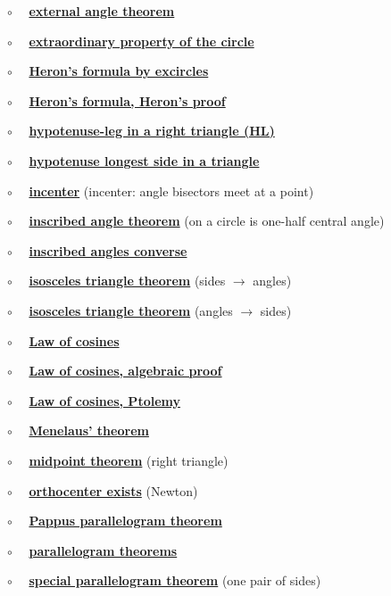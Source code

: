 \documentclass[11pt, oneside]{article}
\begin{document}
$\circ$ \ \ \hyperref[sec:external_angle_theorem]{\textbf{external angle theorem}}

$\circ$ \ \ \hyperref[sec:extraordinary_property]{\textbf{extraordinary property of the circle}}

$\circ$ \ \ \hyperref[sec:Heron_formula_excircles]{\textbf{Heron's formula by excircles}}

$\circ$ \ \ \hyperref[sec:Heron_formula_Heron]{\textbf{Heron's formula, Heron's proof}}

$\circ$ \ \ \hyperref[sec:SSA_in_right]{\textbf{hypotenuse-leg in a right triangle (HL)}}

$\circ$ \ \ \hyperref[sec:hypotenuse_longest]{\textbf{hypotenuse longest side in a triangle}}

$\circ$ \ \ \hyperref[sec:incenter]{\textbf{incenter}} (incenter:  angle bisectors meet at a point)

$\circ$ \ \ \hyperref[sec:inscribed_angle_theorem]{\textbf{inscribed angle theorem}} (on a circle is one-half central angle)

$\circ$ \ \ \hyperref[sec:inscribed_angles_converse]{\textbf{inscribed angles converse}}

$\circ$ \ \  \hyperref[sec:isosceles_triangle_theorem]{\textbf{isosceles triangle theorem}} (sides $\rightarrow$ angles)

$\circ$ \ \  \hyperref[sec:isosceles_converse]{\textbf{isosceles triangle theorem}} (angles $\rightarrow$ sides)

$\circ$ \ \ \hyperref[sec:law_of_cosines]{\textbf{Law of cosines}}

$\circ$ \ \ \hyperref[sec:law_of_cosines_algebraic]{\textbf{Law of cosines, algebraic proof}}

$\circ$ \ \ \hyperref[sec:LOC_by_Ptolemy]{\textbf{Law of cosines, Ptolemy}}

$\circ$ \ \ \hyperref[sec:Menelaus_theorem]{\textbf{Menelaus' theorem}}

$\circ$ \ \ \hyperref[sec:right_triangle_midpoint_theorem]{\textbf{midpoint theorem}} (right triangle)

$\circ$ \ \ \hyperref[sec:Newton_altitude]{\textbf{orthocenter exists}}  (Newton)

$\circ$ \ \ \hyperref[sec:PProof_Pappus]{\textbf{Pappus parallelogram theorem}}

$\circ$ \ \ \hyperref[sec:diagonal_theorem]{\textbf{parallelogram theorems}}

$\circ$ \ \ \hyperref[sec:one_pair_of_sides]{\textbf{special parallelogram theorem}} (one pair of sides)
\end{document}
